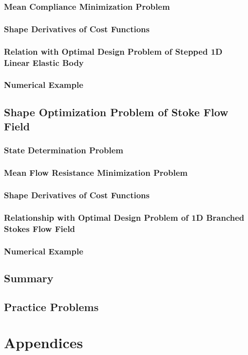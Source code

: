 \documentclass[oneside]{book}
\numberwithin{equation}{section}
\begin{document}
\subsubsection{Mean Compliance Minimization Problem}

\subsubsection{Shape Derivatives of Cost Functions}

\subsubsection{Relation with Optimal Design Problem of Stepped 1D Linear Elastic Body}

\subsubsection{Numerical Example}

\subsection{Shape Optimization Problem of Stoke Flow Field}

\subsubsection{State Determination Problem}

\subsubsection{Mean Flow Resistance Minimization Problem}

\subsubsection{Shape Derivatives of Cost Functions}

\subsubsection{Relationship with Optimal Design Problem of 1D Branched Stokes Flow Field}

\subsubsection{Numerical Example}

\subsection{Summary}

\subsection{Practice Problems}


\section{Appendices}


\printbibliography[heading=bibintoc]
	
\end{document}
